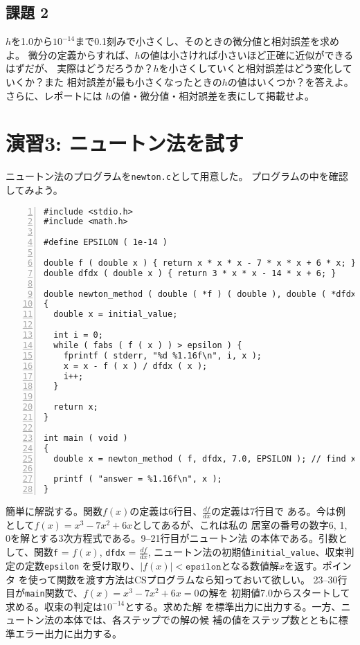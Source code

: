 \documentclass[a4paper]{jsarticle}
\begin{document}
\subsection*{課題 2}
$h$を1.0から$10^{-14}$まで0.1刻みで小さくし、そのときの微分値と相対誤差を求めよ。
微分の定義からすれば、$h$の値は小さければ小さいほど正確に近似ができるはずだが、
実際はどうだろうか？$h$を小さくしていくと相対誤差はどう変化していくか？また
相対誤差が最も小さくなったときの$h$の値はいくつか？を答えよ。さらに、レポートには
$h$の値・微分値・相対誤差を表にして掲載せよ。

\section*{演習3: ニュートン法を試す}

ニュートン法のプログラムを\texttt{newton.c}として用意した。
プログラムの中を確認してみよう。
\begin{lstlisting}[caption={\texttt{newton.c}},numbers=left]
#include <stdio.h>
#include <math.h>

#define EPSILON ( 1e-14 )

double f ( double x ) { return x * x * x - 7 * x * x + 6 * x; } // solutions are 6, 1, 0
double dfdx ( double x ) { return 3 * x * x - 14 * x + 6; }

double newton_method ( double ( *f ) ( double ), double ( *dfdx ) ( double ), double initial_value, double epsilon )
{
  double x = initial_value;

  int i = 0;
  while ( fabs ( f ( x ) ) > epsilon ) {
    fprintf ( stderr, "%d %1.16f\n", i, x );
    x = x - f ( x ) / dfdx ( x );
    i++;
  }

  return x;
}

int main ( void )
{
  double x = newton_method ( f, dfdx, 7.0, EPSILON ); // find x = 6.0 while starting at 7.0

  printf ( "answer = %1.16f\n", x );
}
\end{lstlisting}

簡単に解説する。関数$f(x)$の定義は6行目、$\displaystyle\frac{df}{dx}$の定義は7行目で
ある。今は例として$f(x) = x^{3} - 7x^{2} + 6x$としてあるが、これは私の
居室の番号の数字6, 1, 0を解とする3次方程式である。9--21行目がニュートン法
の本体である。引数として、関数\texttt{f} = $f(x)$, \texttt{dfdx} =
$\displaystyle\frac{df}{dx}$, ニュートン法の初期値\texttt{initial\_value}、収束判定の定数\texttt{epsilon}
を受け取り、$|f(x)| < \texttt{epsilon}$となる数値解$x$を返す。ポインタ
を使って関数を渡す方法はCSプログラムなら知っておいて欲しい。
23--30行目が\texttt{main}関数で、$f(x) = x^{3} - 7x^{2} + 6x = 0$の解を
初期値7.0からスタートして求める。収束の判定は$10^{-14}$とする。求めた解
を標準出力に出力する。一方、ニュートン法の本体では、各ステップでの解の候
補の値をステップ数とともに標準エラー出力に出力する。
\end{document}
